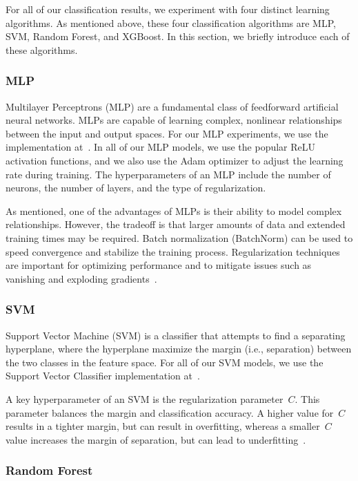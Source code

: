 \documentclass[12pt]{article}
\begin{document}
For all of our classification results, we experiment with four distinct learning algorithms. As mentioned above, these 
four classification algorithms are MLP, SVM, Random Forest, and XGBoost. In this section,
we briefly introduce each of these algorithms.

\subsubsection{MLP}

Multilayer Perceptrons (MLP) are a fundamental class of feedforward artificial neural networks. 
MLPs are capable of learning complex, nonlinear relationships between the input and output spaces. 
For our MLP experiments, we use the implementation at~\cite{scikit-learn_mlp_classifier}.
In all of our MLP models, we use the popular ReLU activation functions, and
we also use the Adam optimizer to adjust the learning rate during training. 
The hyperparameters of an MLP include the number of neurons, the number of layers, 
and the type of regularization. 

As mentioned, one of the advantages of MLPs is their ability to model complex relationships. 
However, the tradeoff is that larger amounts of data and extended training times may be required. 
Batch normalization (BatchNorm) can be used to speed convergence and stabilize the training process. 
Regularization techniques are important for optimizing performance and to mitigate 
issues such as vanishing and exploding gradients~\cite{towardsdatascience_mlp}.

\subsubsection{SVM}

Support Vector Machine (SVM) is a classifier that attempts to find a separating hyperplane, where
the hyperplane maximize the margin (i.e., separation) between the two classes in the feature space. 
For all of our SVM models, we use the Support Vector Classifier implementation
at~\cite{scikit-learn_linear_svc}.

A key hyperparameter of an SVM is
the regularization parameter~$C$. This parameter balances the margin and classification accuracy.
A higher value for~$C$ results in a tighter margin, but can result in overfitting,
whereas a smaller~$C$ value increases the margin of separation, but can lead to 
underfitting~\cite{ibm_svm}.

\subsubsection{Random Forest}
\end{document}
